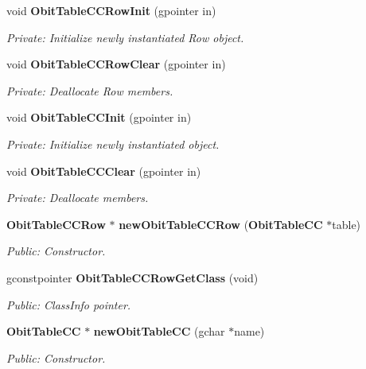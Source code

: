 \begin{CompactItemize}
\item 
void {\bf Obit\-Table\-CCRow\-Init} (gpointer in)
\begin{CompactList}\small\item\em Private: Initialize newly instantiated Row object. \item\end{CompactList}\item 
void {\bf Obit\-Table\-CCRow\-Clear} (gpointer in)
\begin{CompactList}\small\item\em Private: Deallocate Row members. \item\end{CompactList}\item 
void {\bf Obit\-Table\-CCInit} (gpointer in)
\begin{CompactList}\small\item\em Private: Initialize newly instantiated object. \item\end{CompactList}\item 
void {\bf Obit\-Table\-CCClear} (gpointer in)
\begin{CompactList}\small\item\em Private: Deallocate members. \item\end{CompactList}\item 
{\bf Obit\-Table\-CCRow} $\ast$ {\bf new\-Obit\-Table\-CCRow} ({\bf Obit\-Table\-CC} $\ast$table)
\begin{CompactList}\small\item\em Public: Constructor. \item\end{CompactList}\item 
gconstpointer {\bf Obit\-Table\-CCRow\-Get\-Class} (void)
\begin{CompactList}\small\item\em Public: Class\-Info pointer. \item\end{CompactList}\item 
{\bf Obit\-Table\-CC} $\ast$ {\bf new\-Obit\-Table\-CC} (gchar $\ast$name)
\begin{CompactList}\small\item\em Public: Constructor. \item\end{CompactList}\item 

\end{CompactItemize}
